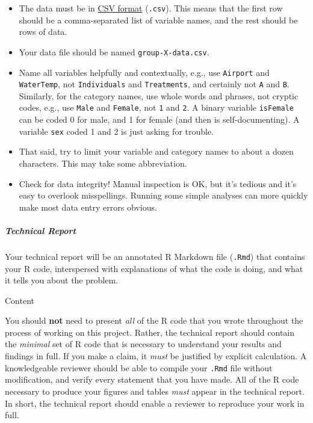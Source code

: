 \documentclass[]{article}
\let\oldsubparagraph\subparagraph
\renewcommand{\subparagraph}[1]{\oldsubparagraph{#1}\mbox{}}
\begin{document}
\begin{itemize}
\item
  The data must be in
  \href{http://en.wikipedia.org/wiki/Comma-separated_values}{CSV format}
  (\texttt{.csv}). This means that the first row should be a
  comma-separated list of variable names, and the rest should be rows of
  data.
\item
  Your data file should be named \texttt{group-X-data.csv}.
\item
  Name all variables helpfully and contextually, e.g., use
  \texttt{Airport} and \texttt{WaterTemp}, not \texttt{Individuals} and
  \texttt{Treatments}, and certainly not \texttt{A} and \texttt{B}.
  Similarly, for the category names, use whole words and phrases, not
  cryptic codes, e.g., use \texttt{Male} and \texttt{Female}, not
  \texttt{1} and \texttt{2}. A binary variable \texttt{isFemale} can be
  coded 0 for male, and 1 for female (and then is self-documenting). A
  variable \texttt{sex} coded 1 and 2 is just asking for trouble.
\item
  That said, try to limit your variable and category names to about a
  dozen characters. This may take some abbreviation.
\item
  Check for data integrity! Manual inspection is OK, but it's tedious
  and it's easy to overlook misspellings. Running some simple analyses
  can more quickly make most data entry errors obvious.
\end{itemize}

\subparagraph{Technical Report}\label{technical-report}

Your technical report will be an annotated R Markdown file
(\texttt{.Rmd}) that contains your R code, interspersed with
explanations of what the code is doing, and what it tells you about the
problem.

Content

You should \textbf{not} need to present \emph{all} of the R code that
you wrote throughout the process of working on this project. Rather, the
technical report should contain the \emph{minimal} set of R code that is
necessary to understand your results and findings in full. If you make a
claim, it \emph{must} be justified by explicit calculation. A
knowledgeable reviewer should be able to compile your \texttt{.Rmd} file
without modification, and verify every statement that you have made. All
of the R code necessary to produce your figures and tables \emph{must}
appear in the technical report. In short, the technical report should
enable a reviewer to reproduce your work in full.
\end{document}
